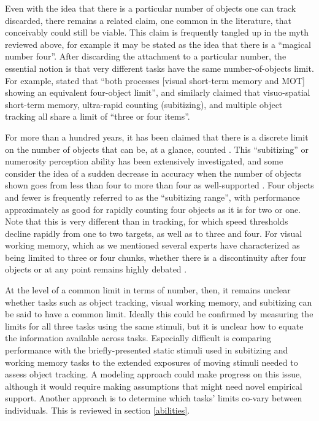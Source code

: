 \documentclass[
]{book}
\begin{document}
Even with the idea that there is a particular number of objects one can track discarded, there remains a related claim, one common in the literature, that conceivably could still be viable. This claim is frequently tangled up in the myth reviewed above, for example it may be stated as the idea that there is a ``magical number four''. After discarding the attachment to a particular number, the essential notion is that very different tasks have the same number-of-objects limit. For example, \citet{bettencourtSharedFilteringProcesses2011} stated that ``both processes {[}visual short-term memory and MOT{]} showing an equivalent four-object limit'', and \citet{piazzaNeurocognitiveStartupTools2010} similarly claimed that visuo-spatial short-term memory, ultra-rapid counting (subitizing), and multiple object tracking all share a limit of ``three or four items''.

For more than a hundred years, it has been claimed that there is a discrete limit on the number of objects that can be, at a glance, counted \citep{jevonsPowerNumericalDiscrimination1871}. This ``subitizing'' or numerosity perception ability has been extensively investigated, and some consider the idea of a sudden decrease in accuracy when the number of objects shown goes from less than four to more than four as well-supported \citep{revkinDoesSubitizingReflect2008}. Four objects and fewer is frequently referred to as the ``subitizing range'', with performance approximately as good for rapidly counting four objects as it is for two or one. Note that this is very different than in tracking, for which speed thresholds decline rapidly from one to two targets, as well as to three and four. For visual working memory, which as we mentioned several experts have characterized as being limited to three or four chunks, whether there is a discontinuity after four objects or at any point remains highly debated \citep[e.g.][]{robinsonThereCapacityAssessing2020}.

At the level of a common limit in terms of number, then, it remains unclear whether tasks such as object tracking, visual working memory, and subitizing can be said to have a common limit. Ideally this could be confirmed by measuring the limits for all three tasks using the same stimuli, but it is unclear how to equate the information available across tasks. Especially difficult is comparing performance with the briefly-presented static stimuli used in subitizing and working memory tasks to the extended exposures of moving stimuli needed to assess object tracking. A modeling approach could make progress on this issue, although it would require making assumptions that might need novel empirical support. Another approach is to determine which tasks' limits co-vary between individuals. This is reviewed in section \ref{abilities}.
\end{document}
